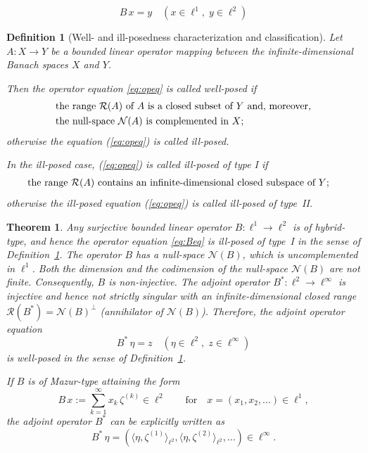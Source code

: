 \documentclass[10pt,a4paper]{amsart}
\newtheorem{definition}{Definition}
\newtheorem{theorem}{Theorem}
\begin{document}
\begin{equation}\label{eq:Beq}
B\, x =y  \quad (x \in \ell^1,\; y \in \ell^2)
\end{equation}

\begin{definition}[Well- and ill-posedness characterization and classification] \label{def:new}
Let $A: X \to Y$ be a bounded linear operator mapping between the
infinite-dimensional Banach spaces $X$ and $Y$.

Then the operator equation \eqref{eq:opeq} is called \emph{well-posed} if
\begin{align*} &\text{the range $\mathcal{R}(A)$ of $A$ is a \emph{closed} subset of $Y$ and, moreover,} \\
&\text{the null-space $\mathcal{N}(A)$ is \emph{complemented} in $X$;}
\end{align*}
otherwise the equation (\ref{eq:opeq}) is called \emph{ill-posed}.

\medskip

In the ill-posed case, (\ref{eq:opeq}) is called \emph{ill-posed of type I}   if
\begin{align*}
&\text{the range $\mathcal{R}(A)$ contains an \emph{infinite-dimensional closed subspace} of $Y$;}
\end{align*}
otherwise the ill-posed
equation (\ref{eq:opeq}) is called \emph{ill-posed of type~II}.
\end{definition}

\begin{theorem} \label{thm:Bprop}
Any surjective bounded linear operator $B: \ell^1 \to \ell^2$ is of hybrid-type, and hence the operator equation \eqref{eq:Beq} is ill-posed of type~I in the sense of Definition~\ref{def:new}.
The operator $B$ has a null-space $\mathcal{N}(B)$, which is uncomplemented in $\ell^1$. Both the dimension and the codimension of the null-space $\mathcal{N}(B)$ are not finite. Consequently,  $B$ is non-injective. The adjoint operator $B^*: \ell^2 \to \ell^\infty$ is injective and hence not strictly singular with an infinite-dimensional closed range $\mathcal{R}(B^*)=\mathcal{N}(B)^\perp$ (annihilator of $\mathcal{N}(B)$). Therefore, the adjoint operator equation
\begin{equation}\label{eq:Beq*}
B^*\,\eta  =z  \quad (\eta \in \ell^2,\; z \in \ell^\infty)
\end{equation}
is well-posed in the sense of Definition~\ref{def:new}.

If $B$ is of Mazur-type attaining the form
\begin{equation}\label{eq:Bstructure}
B\,x:=\sum_{k=1}^\infty x_k\,\zeta^{(k)} \in \ell^2 \qquad \mbox{for} \quad x=(x_1,x_2,...) \in \ell^1,
\end{equation}
the adjoint operator $B^*$ can be explicitly written as
\begin{equation}\label{eq:B*}
B^*\,\eta= (\langle\eta,\zeta^{(1)}\rangle_{\ell^2},\langle\eta,\zeta^{(2)}\rangle_{\ell^2},\ldots)   \in \ell^\infty.
\end{equation}
\end{theorem}
\end{document}

